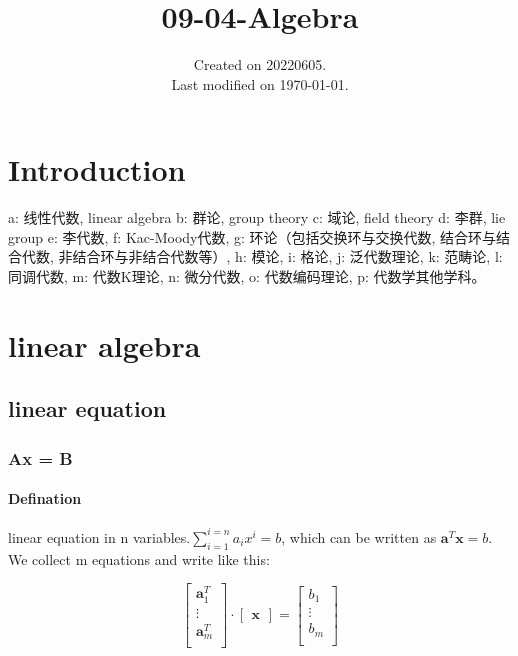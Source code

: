\documentclass[UTF8]{../09-Mathematics}
\begin{document}
\title{09-04-Algebra}
\date{Created on 20220605.\\   Last modified on \today.}
\maketitle
\tableofcontents


\chapter{Introduction}





a: 线性代数, linear algebra
b: 群论, group theory
c: 域论, field theory
d: 李群, lie group
e: 李代数, 
f: Kac-Moody代数, 
g: 环论（包括交换环与交换代数, 结合环与结合代数, 非结合环与非结合代数等）, 
h: 模论, 
i: 格论, 
j: 泛代数理论, 
k: 范畴论, 
l: 同调代数, 
m: 代数K理论, 
n: 微分代数, 
o: 代数编码理论, 
p: 代数学其他学科。



\chapter{linear algebra}

\section{linear equation}

\subsection{Ax = B}

\subsubsection{Defination}

linear equation in n variables.$\sum_{i = 1}^{i=n}a_ix^i = b$, which can be written as $\boldsymbol a^T \boldsymbol x = b$. We collect m equations and write like this:

\begin{equation}
  \begin{bmatrix}
    \boldsymbol a^T_1 \\
    \vdots \\
    \boldsymbol a^T_m \\
  \end{bmatrix}
  \cdot
  \begin{bmatrix}
    \boldsymbol x
  \end{bmatrix}
  =
  \begin{bmatrix}
     b_1 \\
    \vdots \\
     b_m \\
  \end{bmatrix}
\end{equation}
\end{document}
